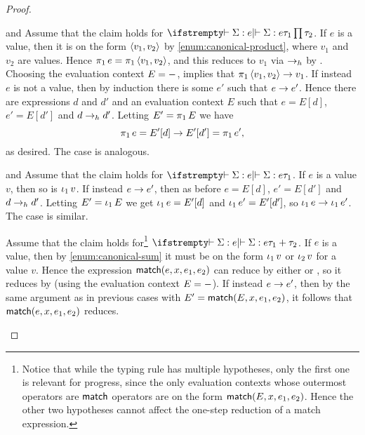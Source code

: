 \begin{proof}
\begin{proofsec}
    \item[\ruleref{Tprojl} and \ruleref{Tprojr}]
    Assume that the claim holds for $\typerel{}{}{\Sigma}{e}{\typeProd{\tau_1}{\tau_2}}$. If $e$ is a value, then it is on the form $\langle\textcolor{black}{v_1},\textcolor{black}{v_2}\rangle$ by \cref{enum:canonical-product}, where $v_1$ and $v_2$ are values. Hence $\expProjl{e} = \expProjl{\expPair{v_1}{v_2}}$, and this reduces to $v_1$ via $\to_h$ by . Choosing the evaluation context $E = {-}$,  implies that $\expProjl{\expPair{v_1}{v_2}} \step v_1$. If instead $e$ is not a value, then by induction there is some $e'$ such that $e \to e'$. Hence there are expressions $d$ and $d'$ and an evaluation context $E$ such that $e = E[d]$, $e' = E[d']$ and $d \to_h d'$. Letting $E' = \expProjl{E}$ we have
    \begin{equation*}
        \expProjl{e}
            = E'[d]
            \step E'[d']
            = \expProjl{e'},
    \end{equation*}
    as desired. The case  is analogous.

    \item[\ruleref{Tinjl} and \ruleref{Tinjr}]
    Assume that the claim holds for $\typerel{}{}{\Sigma}{e}{\tau_1}$. If $e$ is a value $v$, then so is $\expInjl{v}$. If instead $e \to e'$, then as before $e = E[d]$, $e' = E[d']$ and $d \to_h d'$. Letting $E' = \expInjl{E}$ we get $\expInjl{e} = E'[d]$ and $\expInjl{e'} = E'[d']$, so $\expInjl{e} \step \expInjl{e'}$. The case  is similar.

    \item[\ruleref{Tmatch}]
    Assume that the claim holds for\footnote{Notice that while the typing rule  has multiple hypotheses, only the first one is relevant for progress, since the only evaluation contexts whose outermost operators are $\mathsf{match}$ operators are on the form $\mathsf{match}(E,x,e_1,e_2)$. Hence the other two hypotheses cannot affect the one-step reduction of a match expression.} $\typerel{}{}{\Sigma}{e}{\typeSum{\tau_1}{\tau_2}}$. If $e$ is a value, then by \cref{enum:canonical-sum} it must be on the form $\expInjl{v}$ or $\expInjr{v}$ for a value $v$. Hence the expression $\mathsf{match}(e,x,e_1,e_2)$ can reduce by either  or , so it reduces by  (using the evaluation context $E = {-}$). If instead $e \to e'$, then by the same argument as in previous cases with $E' = \mathsf{match}(E,x,e_1,e_2)$, it follows that $\mathsf{match}(e,x,e_1,e_2)$ reduces.


\end{proofsec}
\end{proof}
